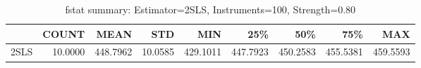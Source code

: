 \begin{table}[ht]
\centering
\caption{fstat summary: Estimator=2SLS, Instruments=100, Strength=0.80}
\begin{tabular}{lrrrrrrrr}
\toprule
 & COUNT & MEAN & STD & MIN & 25\% & 50\% & 75\% & MAX \\
\midrule
2SLS & 10.0000 & 448.7962 & 10.0585 & 429.1011 & 447.7923 & 450.2583 & 455.5381 & 459.5593 \\
\bottomrule
\end{tabular}
\end{table}
